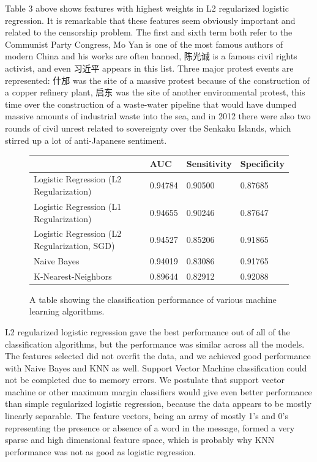 \documentclass{article} %
\begin{document}
\begin{CJK*}{UTF8}{gbsn}
Table 3 above shows features with highest weights in L2 regularized logistic regression. It is remarkable that these features seem obviously important and related to the censorship problem. The first and sixth term both refer to the Communist Party Congress, Mo Yan is one of the most famous authors of modern China and his works are often banned, 陈光诚 is a famous civil rights activist, and even 习近平 appears in this list.  Three major protest events are represented: 什邡 was the site of a massive protest because of the construction of a copper refinery plant, 启东 was the site of another environmental protest, this time over the construction of a waste-water pipeline that would have dumped massive amounts of industrial waste into the sea, and in 2012 there were also two rounds of civil unrest related to sovereignty over the Senkaku Islands, which stirred up a lot of anti-Japanese sentiment.  


\begin{figure}[!htb]
	\begin{center}
		    \begin{tabular}{ |l | l | l | l |}
		    \hline
		    & AUC & Sensitivity & Specificity \\\hline
		    Logistic Regression (L2 Regularization) & 0.94784 & 0.90500 & 0.87685 \\ \hline
		    Logistic Regression (L1 Regularization) & 0.94655 & 0.90246 & 0.87647 \\ \hline
		  	Logistic Regression (L2 Regularization, SGD) & 0.94527 & 0.85206 & 0.91865 \\\hline
		   	Naive Bayes & 0.94019 & 0.83086 & 0.91765\\\hline
		   	K-Nearest-Neighbors & 0.89644 & 0.82912 & 0.92088\\\hline
		    \end{tabular}
	\end{center}
\caption{A table showing the classification performance of various machine learning algorithms.}
\vspace{-10pt}
\end{figure}

L2 regularized logistic regression gave the best performance out of all of the classification algorithms, but the performance was similar across all the models. The features selected did not overfit the data, and we achieved good performance with Naive Bayes and KNN as well. Support Vector Machine classification could not be completed due to memory errors. We postulate that support vector machine or other maximum margin classifiers would give even better performance than simple regularized logistic regression, because the data appears to be mostly linearly separable. The feature vectors, being an array of mostly 1's and 0's representing the presence or absence of a word in the message, formed a very sparse and high dimensional feature space, which is probably why KNN performance was not as good as logistic regression. 


\end{CJK*}
\end{document}

